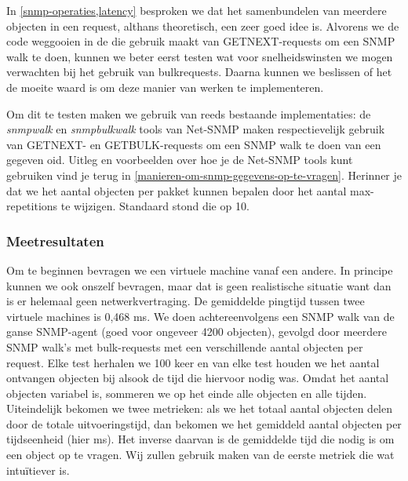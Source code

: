 In \cref{snmp-operaties,latency} besproken we dat het samenbundelen van meerdere objecten in een request, althans theoretisch, een zeer goed idee is.
Alvorens we de code weggooien in de \nwmretriever{} die gebruik maakt van GETNEXT-requests om een SNMP walk te doen,
kunnen we beter eerst testen wat voor snelheidswinsten we mogen verwachten bij het gebruik van bulkrequests.
Daarna kunnen we beslissen of het de moeite waard is om deze manier van werken te implementeren.

Om dit te testen maken we gebruik van reeds bestaande implementaties:
de \textit{snmpwalk} en \mbox{\textit{snmpbulkwalk}} tools van Net-SNMP maken respectievelijk gebruik van GETNEXT- en
GETBULK-requests om een SNMP walk te doen van een gegeven \gls{oid}.
Uitleg en voorbeelden over hoe je de Net-SNMP tools kunt gebruiken vind je terug in \cref{manieren-om-snmp-gegevens-op-te-vragen}.
Herinner je dat we het aantal objecten per pakket kunnen bepalen door het aantal max-repetitions te wijzigen.
Standaard stond die op 10.

\subsubsection{Meetresultaten}

Om te beginnen bevragen we een virtuele machine vanaf een andere.
In principe kunnen we ook onszelf bevragen, maar dat is geen realistische situatie want dan is er helemaal geen netwerkvertraging.
De gemiddelde pingtijd tussen twee virtuele machines is 0,468 ms.
We doen achtereenvolgens een SNMP walk van de ganse SNMP-agent (goed voor ongeveer 4200 objecten),
gevolgd door meerdere SNMP walk's met bulk-requests met een verschillende aantal objecten per request.
Elke test herhalen we 100 keer en van elke test houden we het aantal ontvangen objecten bij alsook de tijd die hiervoor nodig was.
Omdat het aantal objecten variabel is, sommeren we op het einde alle objecten en alle tijden.
Uiteindelijk bekomen we twee metrieken: als we het totaal aantal objecten delen door de totale uitvoeringstijd,
dan bekomen we het gemiddeld aantal objecten per tijdseenheid (hier ms).
Het inverse daarvan is de gemiddelde tijd die nodig is om een object op te vragen.
Wij zullen gebruik maken van de eerste metriek die wat intuïtiever is.

